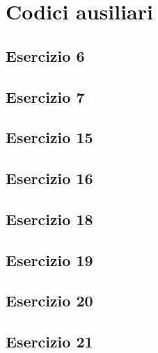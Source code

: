 \section{Codici ausiliari}

\subsection{Esercizio 6}

 
\subsection{Esercizio 7}


\subsection{Esercizio 15}


\subsection{Esercizio 16}


\subsection{Esercizio 18}


\subsection{Esercizio 19}


\subsection{Esercizio 20}


\subsection{Esercizio 21}


